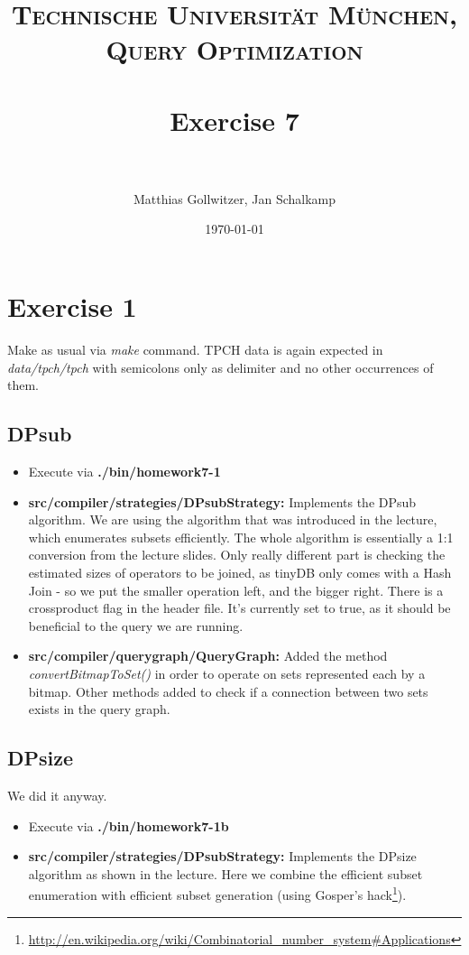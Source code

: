 \documentclass[paper=a4, fontsize=11pt]{scrartcl} %
\title{	
\normalfont \normalsize 
\textsc{Technische Universit\"at M\"unchen, Query Optimization} \\ [25pt] %
\horrule{0.5pt} \\[0.4cm] %
\huge Exercise 7 \\ %
\horrule{2pt} \\[0.5cm] %
}
\author{Matthias Gollwitzer, Jan Schalkamp} %
\date{\normalsize\today} %
\numberwithin{equation}{section} %
\numberwithin{figure}{section} %
\numberwithin{table}{section} %
\begin{document}
\lstset{language=SQL}
\maketitle %


\section{Exercise 1}
Make as usual via \textit{make} command. TPCH data is again expected in \textit{data/tpch/tpch} with semicolons only as delimiter and no other occurrences of them.
\subsection{DPsub}
	\begin{itemize}
		\item Execute via \textbf{./bin/homework7-1}
		\item \textbf{src/compiler/strategies/DPsubStrategy:} Implements the DPsub algorithm. We are using the algorithm that was introduced in the lecture, which enumerates subsets efficiently. The whole algorithm is essentially a 1:1 conversion from the lecture slides. Only really different part is checking the estimated sizes of operators to be joined, as tinyDB only comes with a Hash Join - so we put the smaller operation left, and the bigger right. There is a crossproduct flag in the header file. It's currently set to true, as it should be beneficial to the query we are running.
		\item \textbf{src/compiler/querygraph/QueryGraph:} Added the method \textit{convertBitmapToSet()} in order to operate on sets represented each by a bitmap. Other methods added to check if a connection between two sets exists in the query graph.
	\end{itemize}

\subsection{DPsize}
	We did it anyway. 
	\begin{itemize}
		\item Execute via \textbf{./bin/homework7-1b}
		\item \textbf{src/compiler/strategies/DPsubStrategy:} Implements the DPsize algorithm as shown in the lecture. Here we combine the efficient subset enumeration with efficient  subset generation (using Gosper's hack\footnote{ \url{http://en.wikipedia.org/wiki/Combinatorial_number_system\#Applications} }).
	
	\end{itemize}
\end{document}
